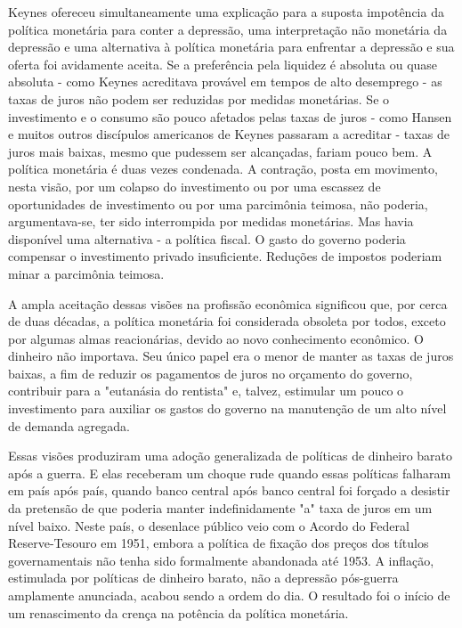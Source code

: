 \documentclass[a4paper,12pt]{article}[abntex2]
\begin{document}
Keynes ofereceu simultaneamente uma explicação para a suposta impotência da política monetária para conter a depressão, uma interpretação não monetária da depressão e uma alternativa à política monetária para enfrentar a depressão e sua oferta foi avidamente aceita. Se a preferência pela liquidez é absoluta ou quase absoluta - como Keynes acreditava provável em tempos de alto desemprego - as taxas de juros não podem ser reduzidas por medidas monetárias. Se o investimento e o consumo são pouco afetados pelas taxas de juros - como Hansen e muitos outros discípulos americanos de Keynes passaram a acreditar - taxas de juros mais baixas, mesmo que pudessem ser alcançadas, fariam pouco bem. A política monetária é duas vezes condenada. A contração, posta em movimento, nesta visão, por um colapso do investimento ou por uma escassez de oportunidades de investimento ou por uma parcimônia teimosa, não poderia, argumentava-se, ter sido interrompida por medidas monetárias. Mas havia disponível uma alternativa - a política fiscal. O gasto do governo poderia compensar o investimento privado insuficiente. Reduções de impostos poderiam minar a parcimônia teimosa.

A ampla aceitação dessas visões na profissão econômica significou que, por cerca de duas décadas, a política monetária foi considerada obsoleta por todos, exceto por algumas almas reacionárias, devido ao novo conhecimento econômico. O dinheiro não importava. Seu único papel era o menor de manter as taxas de juros baixas, a fim de reduzir os pagamentos de juros no orçamento do governo, contribuir para a "eutanásia do rentista" e, talvez, estimular um pouco o investimento para auxiliar os gastos do governo na manutenção de um alto nível de demanda agregada.

Essas visões produziram uma adoção generalizada de políticas de dinheiro barato após a guerra. E elas receberam um choque rude quando essas políticas falharam em país após país, quando banco central após banco central foi forçado a desistir da pretensão de que poderia manter indefinidamente "a" taxa de juros em um nível baixo. Neste país, o desenlace público veio com o Acordo do Federal Reserve-Tesouro em 1951, embora a política de fixação dos preços dos títulos governamentais não tenha sido formalmente abandonada até 1953. A inflação, estimulada por políticas de dinheiro barato, não a depressão pós-guerra amplamente anunciada, acabou sendo a ordem do dia. O resultado foi o início de um renascimento da crença na potência da política monetária.
\end{document}
